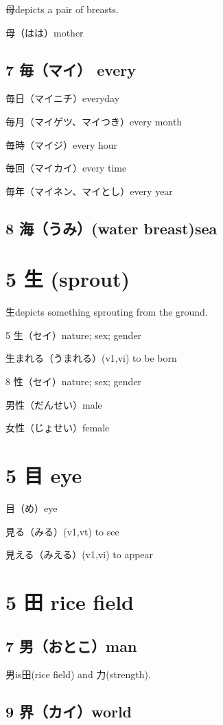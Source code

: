 母depicts a pair of breasts.

母（はは）mother

\subsection{7 毎（マイ） every}

毎日（マイニチ）everyday

毎月（マイゲツ、マイつき）every month

毎時（マイジ）every hour

毎回（マイカイ）every time

毎年（マイネン、マイとし）every year

\subsection{8 海（うみ）(water breast)sea}

\section{5 生 (sprout)}

生depicts something sprouting from the ground.

5 生（セイ）nature; sex; gender

生まれる（うまれる）(v1,vi) to be born

8 性（セイ）nature; sex; gender

男性（だんせい）male

女性（じょせい）female

\section{5 目 eye}

目（め）eye

見る（みる）(v1,vt) to see

見える（みえる）(v1,vi) to appear

\section{5 田 rice field}

\subsection{7 男（おとこ）man}

男is田(rice field) and 力(strength).

\subsection{9 界（カイ）world}

